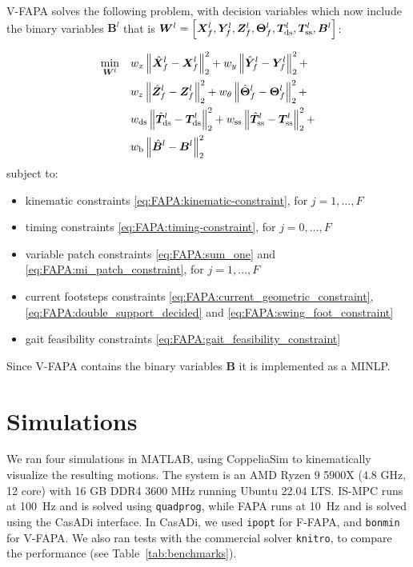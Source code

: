 V-FAPA solves the following problem, with decision variables which now include
the binary variables $\bm{B}^{l}$ that is ${\bm{W}}^l = \left[\bm{X}_f^l, \bm{Y}_f^l, \bm{Z}_f^l, \bm{\Theta}_f^l, \bm{T}_{\rm ds}^l, \bm{T}_{\rm ss}^l, \bm{B}^{l}\right]$:
\begin{braced}
    \begin{equation*}
        \begin{split}
            \min_{{\bm{W}}^l} \quad
            & w_x \left\| \hat{\bm{X}}_f^l - \bm{X}_f^l \right\|_2^2 + w_y \left\| \hat{\bm{Y}}_f^l - \bm{Y}_f^l \right\|_2^2 + \\& w_z \left\| \hat{\bm{Z}}_f^l - \bm{Z}_f^l \right\|_2^2 + w_{\theta} \left\| \hat{\bm{\Theta}}_f^l - \bm{\Theta}_f^l \right\|_2^2 + \\& w_{\rm ds} \left\| \hat{\bm{T}}_{\rm ds}^l - \bm{T}_{\rm ds}^l \right\|_2^2 + w_{\rm ss} \left\| \hat{\bm{T}}_{\rm ss}^l - \bm{T}_{\rm ss}^l \right\|_2^2 +  \\&
            w_{\rm b} \left\| \hat{\bm{B}}^l - \bm{B}^l \right\|_2^2
        \end{split}
    \end{equation*}
    \hspace{0.25cm} subject to:
    \begin{itemize}
        \item kinematic constraints \eqref{eq:FAPA:kinematic-constraint}, for $j=1,\dots,F$
        \item timing constraints \eqref{eq:FAPA:timing-constraint}, for $j=0,\dots,F$
        \item variable patch constraints \eqref{eq:FAPA:sum_one} and \eqref{eq:FAPA:mi_patch_constraint}, for $j=1,\dots,F$
        \item current footsteps constraints \eqref{eq:FAPA:current_geometric_constraint}, \eqref{eq:FAPA:double_support_decided} and \eqref{eq:FAPA:swing_foot_constraint}
        \item gait feasibility constraints \eqref{eq:FAPA:gait_feasibility_constraint}
    \end{itemize}
\end{braced}

\medskip

Since V-FAPA contains the binary variables $\bm{B}$ it is implemented as a MINLP.

\section{Simulations}
\label{sec:FAPA:Simulations}
We ran four simulations in MATLAB, using CoppeliaSim to kinematically
visualize the resulting motions. The system is an AMD Ryzen 9 5900X
(4.8 GHz, 12 core) with 16 GB DDR4 3600 MHz running Ubuntu 22.04 LTS. IS-MPC
runs at 100~Hz and is solved using \texttt{quadprog}, while FAPA runs at
10~Hz and is solved using the CasADi interface. In CasADi, we used
\texttt{ipopt} for F-FAPA, and \texttt{bonmin} for V-FAPA. We also ran tests
with the commercial solver \texttt{knitro}, to compare the performance
(see Table~\ref{tab:benchmarks}).

